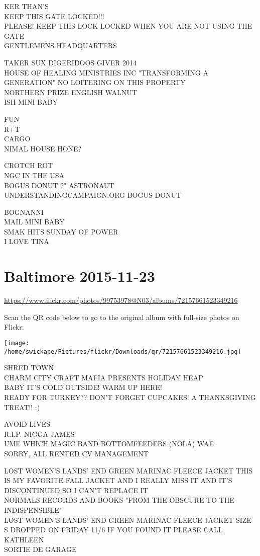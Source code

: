 \documentclass[10pt,letterpaper]{article}
\begin{document}
KER THAN'S\\
KEEP THIS GATE LOCKED!!!\\
PLEASE!  KEEP THIS LOCK LOCKED WHEN YOU ARE NOT USING THE GATE\\
GENTLEMENS HEADQUARTERS

TAKER SUX DIGERIDOOS GIVER 2014\\
HOUSE OF HEALING MINISTRIES INC "TRANSFORMING A GENERATION" NO LOITERING ON THIS PROPERTY\\
NORTHERN PRIZE ENGLISH WALNUT\\
ISH MINI BABY

FUN\\
R+T\\
CARGO\\
NIMAL HOUSE HONE?

CROTCH ROT\\
NGC IN THE USA\\
BOGUS DONUT 2" ASTRONAUT\\
UNDERSTANDINGCAMPAIGN.ORG BOGUS DONUT

BOGNANNI\\
MAIL MINI BABY\\
SMAK HITS SUNDAY OF POWER\\
I LOVE TINA


\section*{Baltimore 2015-11-23}

\url{https://www.flickr.com/photos/99753978@N03/albums/72157661523349216}

Scan the QR code below to go to the original album with full-size photos on Flickr:

\texttt{[image: /home/swickape/Pictures/flickr/Downloads/qr/72157661523349216.jpg]}


SHRED TOWN\\
CHARM CITY CRAFT MAFIA PRESENTS HOLIDAY HEAP\\
BABY IT'S COLD OUTSIDE!  WARM UP HERE!\\
READY FOR TURKEY??  DON'T FORGET CUPCAKES!  A THANKSGIVING TREAT!! :)

AVOID LIVES\\
R.I.P. NIGGA JAMES\\
UME WHICH MAGIC BAND BOTTOMFEEDERS (NOLA) WAE\\
SORRY, ALL RENTED CV MANAGEMENT

LOST WOMEN'S LANDS' END GREEN MARINAC FLEECE JACKET THIS IS MY FAVORITE FALL JACKET AND I REALLY MISS IT AND IT'S DISCONTINUED SO I CAN'T REPLACE IT\\
NORMALS RECORDS AND BOOKS "FROM THE OBSCURE TO THE INDISPENSIBLE"\\
LOST WOMEN'S LANDS' END GREEN MARINAC FLEECE JACKET SIZE S DROPPED ON FRIDAY 11/6 IF YOU FOUND IT PLEASE CALL KATHLEEN\\
SORTIE DE GARAGE
\end{document}
